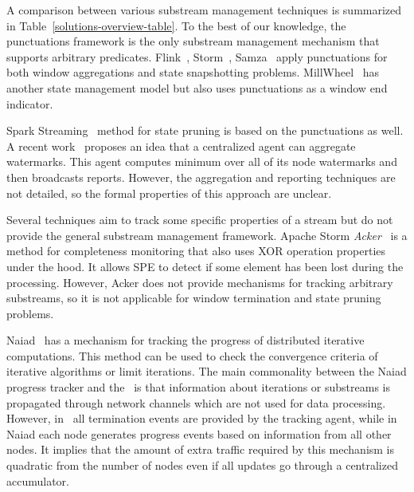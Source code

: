 \label {fs-acker-related}

A comparison between various substream management techniques is summarized in Table~\ref{solutions-overview-table}. To the best of our knowledge, the punctuations framework is the only substream management mechanism that supports arbitrary predicates. 
Flink~\cite{Carbone:2017:SMA:3137765.3137777}, Storm~\cite{Toshniwal:2014:STO:2588555.2595641}, Samza~\cite{Noghabi:2017:SSS:3137765.3137770} apply punctuations for both window aggregations and state snapshotting problems. MillWheel~\cite{Akidau:2013:MFS:2536222.2536229} has another state management model but also uses punctuations as a window end indicator. 

Spark Streaming~\cite{Zaharia:2012:DSE:2342763.2342773} method for state pruning is based on the punctuations as well. A recent work~\cite{DBLP:journals/pvldb/BegoliACHKKMS21} proposes an idea that a centralized agent can aggregate watermarks. This agent computes minimum over all of its node watermarks and then broadcasts reports. However, the aggregation and reporting techniques are not detailed, so the formal properties of this approach are unclear. 

Several techniques aim to track some specific properties of a stream but do not provide the general substream management framework. Apache Storm {\em Acker}~\cite{apache:storm:acker} is a method for completeness monitoring that also uses XOR operation properties under the hood. It allows SPE to detect if some element has been lost during the processing. However, Acker does not provide mechanisms for tracking arbitrary substreams, so it is not applicable for window termination and state pruning problems. 

Naiad~\cite{Murray:2013:NTD:2517349.2522738} has a mechanism for tracking the progress of distributed iterative computations. This method can be used to check the convergence criteria of iterative algorithms or limit iterations. The main commonality between the Naiad progress tracker and the \tracker\ is that information about iterations or substreams is propagated through network channels which are not used for data processing. However, in \tracker\ all termination events are provided by the tracking agent, while in Naiad each node generates progress events based on information from all other nodes. It implies that the amount of extra traffic required by this mechanism is quadratic from the number of nodes even if all updates go through a centralized accumulator.

